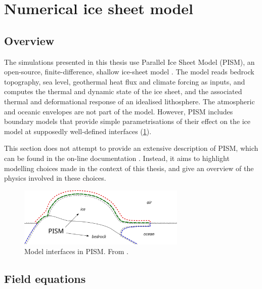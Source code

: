 \documentclass{article}
\begin{document}
\section{Numerical ice sheet model}

\subsection{Overview}

The simulations presented in this thesis use Parallel Ice Sheet Model (PISM),
an open-source, finite-difference, shallow ice-sheet model
\citep{PISM-authors.2014}. The model reads bedrock topography, sea level,
geothermal heat flux and climate forcing as inputs, and computes the thermal
and dynamic state of the ice sheet, and the associated thermal and
deformational response of an idealised lithosphere. The atmospheric and oceanic
envelopes are not part of the model. However, PISM includes boundary models
that provide simple parametrisations of their effect on the ice model at
supposedly well-defined interfaces (\cref{fig:model-interfaces}).

This section does not attempt to provide an extensive description of PISM,
which can be found in the on-line documentation \citep{PISM-authors.2014}.
Instead, it aims to highlight modelling choices made in the context of this
thesis, and give an overview of the physics involved in these choices.

\begin{figure}
  \centering
  \includegraphics[width=80mm]{model-interfaces}
  \caption{Model interfaces in PISM. From \citet{PISM-authors.2014}.}
  \label{fig:model-interfaces}
\end{figure}

\subsection{Field equations}
\end{document}
